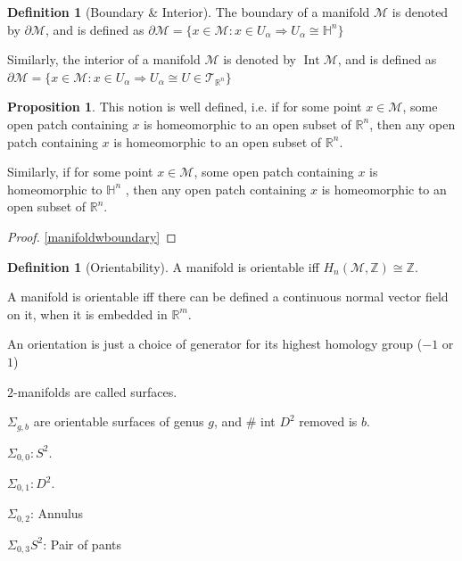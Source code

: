 \documentclass[12pt]{report}
\theoremstyle{definition}
\newtheorem{prop}[thm]{Proposition}
\newtheorem{defn}[thm]{Definition}
\newcommand{\bb}[1]{\mathbb{#1}}
\renewcommand{\cal}[1]{\mathcal{#1}}
\DeclareMathOperator{\In}{Int}
\begin{document}
\begin{defn}[Boundary \& Interior]
The boundary of a manifold $\cal{M}$ is denoted by $\partial \cal{M}$, and is defined as $\partial \cal{M} = \{x \in \cal{M}: x \in U_{\alpha} \Rightarrow U_{\alpha} \cong  \bb{H}^n\}$

Similarly, the interior of a manifold $\cal{M}$ is denoted by $\In \cal{M}$, and is defined as $\partial \cal{M} = \{x \in \cal{M}: x \in U_{\alpha} \Rightarrow U_{\alpha} \cong  U \in \cal{T}_{\bb{R}^n}\}$
\end{defn}
\begin{prop}
This notion is well defined, i.e. if for some point $x \in \cal{M}$, some open patch containing $x$ is homeomorphic to an open subset of $\bb{R}^n$, then any open patch containing $x$ is homeomorphic to an open subset of $\bb{R}^n$. 

Similarly, if for some point $x \in \cal{M}$, some open patch containing $x$ is homeomorphic to $\bb{H}^n$ , then any open patch containing $x$ is homeomorphic to an open subset of $\bb{R}^n$. 

\end{prop}
\begin{proof}
\ref{manifoldwboundary}
\end{proof}


\begin{defn}[Orientability]
A manifold is orientable iff $H_n(\cal{M}, \bb{Z}) \cong \bb{Z}$. 

\end{defn}


A manifold is orientable iff there can be defined a continuous normal vector field on it, when it is embedded in $\bb{R}^m$.

An orientation is just a choice of generator for its highest homology group ($-1$ or $1$)

$2$-manifolds are called surfaces.

$\Sigma_{g, b}$ are orientable surfaces of genus $g$, and \# int $D^2$ removed is $b$. 

$\Sigma_{0, 0}: S^2$.

$\Sigma_{0, 1}: D^2$.

$\Sigma_{0, 2}$: Annulus

$\Sigma_{0, 3} S^2$: Pair of pants
\end{document}
